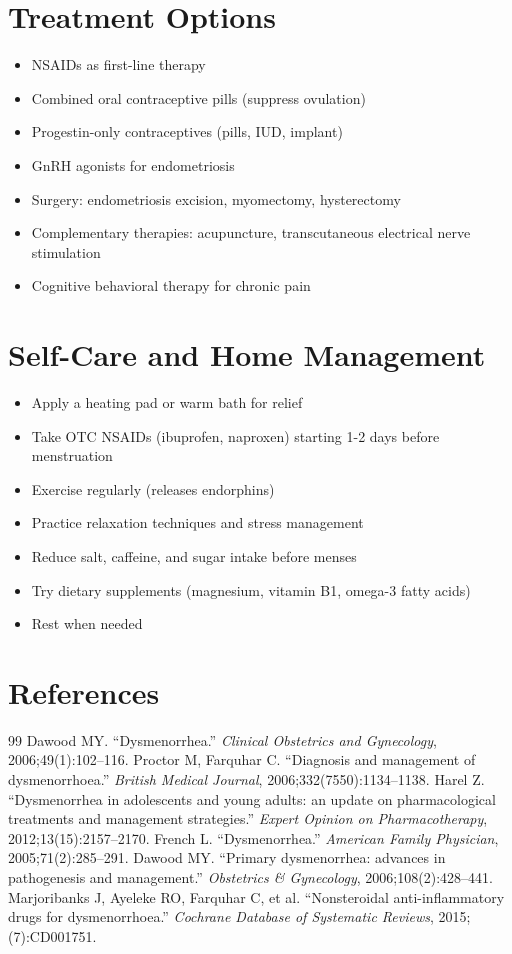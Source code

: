 \section*{Treatment Options}
\begin{itemize}
\item NSAIDs as first-line therapy
\item Combined oral contraceptive pills (suppress ovulation)
\item Progestin-only contraceptives (pills, IUD, implant)
\item GnRH agonists for endometriosis
\item Surgery: endometriosis excision, myomectomy, hysterectomy
\item Complementary therapies: acupuncture, transcutaneous electrical nerve stimulation
\item Cognitive behavioral therapy for chronic pain
\end{itemize}

\section*{Self-Care and Home Management}
\begin{itemize}
\item Apply a heating pad or warm bath for relief
\item Take OTC NSAIDs (ibuprofen, naproxen) starting 1-2 days before menstruation
\item Exercise regularly (releases endorphins)
\item Practice relaxation techniques and stress management
\item Reduce salt, caffeine, and sugar intake before menses
\item Try dietary supplements (magnesium, vitamin B1, omega-3 fatty acids)
\item Rest when needed
\end{itemize}

\section*{References}
\begin{thebibliography}{99}
 Dawood MY. ``Dysmenorrhea.'' \textit{Clinical Obstetrics and Gynecology}, 2006;49(1):102--116.
 Proctor M, Farquhar C. ``Diagnosis and management of dysmenorrhoea.'' \textit{British Medical Journal}, 2006;332(7550):1134--1138.
 Harel Z. ``Dysmenorrhea in adolescents and young adults: an update on pharmacological treatments and management strategies.'' \textit{Expert Opinion on Pharmacotherapy}, 2012;13(15):2157--2170.
 French L. ``Dysmenorrhea.'' \textit{American Family Physician}, 2005;71(2):285--291.
 Dawood MY. ``Primary dysmenorrhea: advances in pathogenesis and management.'' \textit{Obstetrics \& Gynecology}, 2006;108(2):428--441.
 Marjoribanks J, Ayeleke RO, Farquhar C, et al. ``Nonsteroidal anti-inflammatory drugs for dysmenorrhoea.'' \textit{Cochrane Database of Systematic Reviews}, 2015;(7):CD001751.

\end{thebibliography}
